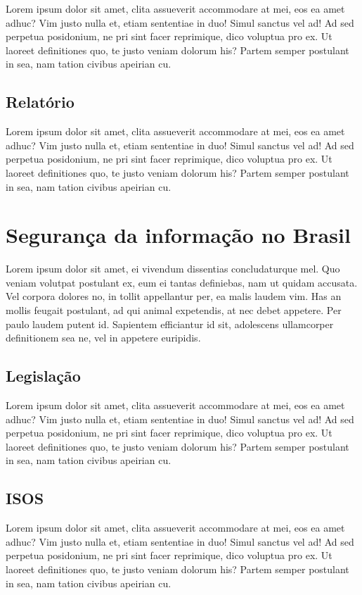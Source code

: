 \documentclass[
	12pt,				%
	openright,			%
	oneside,			%
	a4paper,			%
	english,			%
	french,				%
	spanish,			%
	brazil,				%
	]{abntex2}
\begin{document}
Lorem ipsum dolor sit amet, clita assueverit accommodare at mei, eos ea amet adhuc? Vim justo nulla et, etiam sententiae in duo! Simul sanctus vel ad! Ad sed perpetua posidonium, ne pri sint facer reprimique, dico voluptua pro ex. Ut laoreet definitiones quo, te justo veniam dolorum his? Partem semper postulant in sea, nam tation civibus apeirian cu.


\subsection{Relatório}

Lorem ipsum dolor sit amet, clita assueverit accommodare at mei, eos ea amet adhuc? Vim justo nulla et, etiam sententiae in duo! Simul sanctus vel ad! Ad sed perpetua posidonium, ne pri sint facer reprimique, dico voluptua pro ex. Ut laoreet definitiones quo, te justo veniam dolorum his? Partem semper postulant in sea, nam tation civibus apeirian cu.

\section{Segurança da informação no Brasil}
\label{sec: exemplo}

Lorem ipsum dolor sit amet, ei vivendum dissentias concludaturque mel. Quo veniam volutpat postulant ex, eum ei tantas definiebas, nam ut quidam accusata. Vel corpora dolores no, in tollit appellantur per, ea malis laudem vim. Has an mollis feugait postulant, ad qui animal expetendis, at nec debet appetere. Per paulo laudem putent id. Sapientem efficiantur id sit, adolescens ullamcorper definitionem sea ne, vel in appetere euripidis.

\subsection{Legislação}

Lorem ipsum dolor sit amet, clita assueverit accommodare at mei, eos ea amet adhuc? Vim justo nulla et, etiam sententiae in duo! Simul sanctus vel ad! Ad sed perpetua posidonium, ne pri sint facer reprimique, dico voluptua pro ex. Ut laoreet definitiones quo, te justo veniam dolorum his? Partem semper postulant in sea, nam tation civibus apeirian cu.


\subsection{ISOS}

Lorem ipsum dolor sit amet, clita assueverit accommodare at mei, eos ea amet adhuc? Vim justo nulla et, etiam sententiae in duo! Simul sanctus vel ad! Ad sed perpetua posidonium, ne pri sint facer reprimique, dico voluptua pro ex. Ut laoreet definitiones quo, te justo veniam dolorum his? Partem semper postulant in sea, nam tation civibus apeirian cu.
\end{document}
